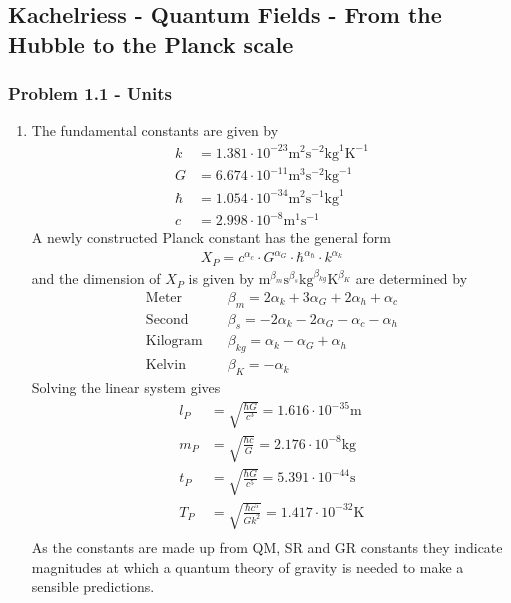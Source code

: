 \documentclass[10pt,a4paper]{article}
\theoremstyle{definition}
\begin{document}
\subsection{{\sc Kachelriess} - Quantum Fields - From the Hubble to the Planck scale}
\subsubsection{Problem 1.1 - Units}
\begin{enumerate}
\item The fundamental constants are given by
\begin{align}
    k    &=1.381\cdot10^{-23} \text{m}^2\text{s}^{-2}\text{kg}^{ 1}\text{K}^{-1}\\
    G    &=6.674\cdot10^{-11} \text{m}^3\text{s}^{-2}\text{kg}^{-1}\\
    \hbar&=1.054\cdot10^{-34} \text{m}^2\text{s}^{-1}\text{kg}^{ 1}\\
    c    &=2.998\cdot10^{-8}  \text{m}^1\text{s}^{-1}
\end{align}
A newly constructed Planck constant has the general form
\begin{align}
    X_P=c^{\alpha_c}\cdot G^{\alpha_G}\cdot \hbar^{\alpha_\hbar}\cdot k^{\alpha_k}
\end{align}
and the dimension of $X_P$ is given by $\text{m}^{\beta_m}\text{s}^{\beta_s}\text{kg}^{\beta_{kg}}\text{K}^{\beta_K}$ are determined by
\begin{align}
    \text{Meter}\quad    &\beta_m=2\alpha_k+3\alpha_G+2\alpha_h+\alpha_c\\
    \text{Second}\quad   &\beta_s=-2\alpha_k-2\alpha_G-\alpha_c-\alpha_h\\
    \text{Kilogram}\quad &\beta_{kg}=\alpha_k-\alpha_G+\alpha_h\\
    \text{Kelvin}\quad   &\beta_K=-\alpha_k
\end{align}
Solving the linear system gives
\begin{align}
    l_P&=\sqrt{\frac{\hbar G}{c^3}}=1.616\cdot 10^{-35}\text{m}\\
    m_P&=\sqrt{\frac{\hbar c}{G}}=2.176\cdot 10^{-8}\text{kg}\\
    t_P&=\sqrt{\frac{\hbar G}{c^5}}=5.391\cdot 10^{-44}\text{s}\\
    T_P&=\sqrt{\frac{\hbar c^5}{Gk^2}}=1.417\cdot 10^{-32}\text{K}\\
\end{align}
As the constants are made up from QM, SR and GR constants they indicate magnitudes at which a quantum theory of gravity is needed to make a sensible predictions.


\end{enumerate}
\end{document}
